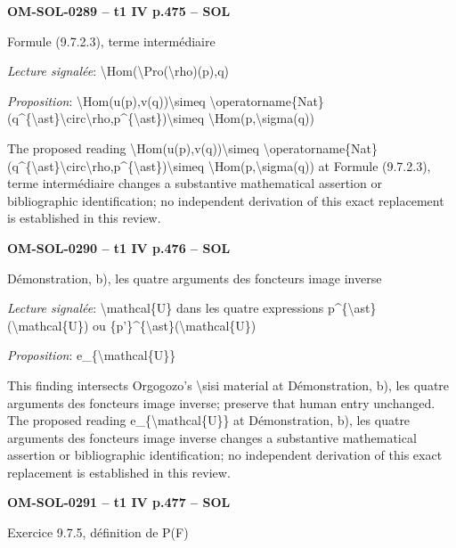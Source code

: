 \par\noindent\textbf{OM-SOL-0289 -- t1 IV p.475 -- SOL}\par
Formule (9.7.2.3), terme intermédiaire\par
\emph{Lecture signalée}: \textbackslash{}Hom(\textbackslash{}Pro(\textbackslash{}rho)(p),q)\par
\emph{Proposition}: \textbackslash{}Hom(u(p),v(q))\textbackslash{}simeq \textbackslash{}operatorname\{Nat\}(q\textasciicircum{}\{\textbackslash{}ast\}\textbackslash{}circ\textbackslash{}rho,p\textasciicircum{}\{\textbackslash{}ast\})\textbackslash{}simeq \textbackslash{}Hom(p,\textbackslash{}sigma(q))\par
The proposed reading \textbackslash{}Hom(u(p),v(q))\textbackslash{}simeq \textbackslash{}operatorname\{Nat\}(q\textasciicircum{}\{\textbackslash{}ast\}\textbackslash{}circ\textbackslash{}rho,p\textasciicircum{}\{\textbackslash{}ast\})\textbackslash{}simeq \textbackslash{}Hom(p,\textbackslash{}sigma(q)) at Formule (9.7.2.3), terme intermédiaire changes a substantive mathematical assertion or bibliographic identification; no independent derivation of this exact replacement is established in this review.\par
\par\noindent\textbf{OM-SOL-0290 -- t1 IV p.476 -- SOL}\par
Démonstration, b), les quatre arguments des foncteurs image inverse\par
\emph{Lecture signalée}: \textbackslash{}mathcal\{U\} dans les quatre expressions p\textasciicircum{}\{\textbackslash{}ast\}(\textbackslash{}mathcal\{U\}) ou \{p'\}\textasciicircum{}\{\textbackslash{}ast\}(\textbackslash{}mathcal\{U\})\par
\emph{Proposition}: e\_\{\textbackslash{}mathcal\{U\}\}\par
This finding intersects Orgogozo's \textbackslash{}sisi material at Démonstration, b), les quatre arguments des foncteurs image inverse; preserve that human entry unchanged. The proposed reading e\_\{\textbackslash{}mathcal\{U\}\} at Démonstration, b), les quatre arguments des foncteurs image inverse changes a substantive mathematical assertion or bibliographic identification; no independent derivation of this exact replacement is established in this review.\par
\par\noindent\textbf{OM-SOL-0291 -- t1 IV p.477 -- SOL}\par
Exercice 9.7.5, définition de P(F)\par
